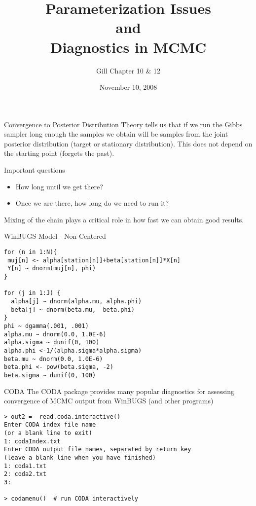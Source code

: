 \documentclass[dvips]{beamer}
\title{Parameterization Issues \\ and \\Diagnostics in MCMC}
\author{Gill Chapter 10 \& 12}
\date{November 10, 2008}
\begin{document}
\maketitle
\begin{slide}{Convergence to Posterior Distribution}
Theory tells us that if we run the Gibbs sampler long enough the
samples we obtain will be samples from the joint posterior
distribution (target or stationary distribution).  This does not
depend on the starting point (forgets the past).

\vspace{.25in}
Important questions
\begin{itemize}
\item  How long until we get there?
\item  Once we are there, how long do we need to run it?
\end{itemize}
Mixing of the chain plays a critical role in how fast we can obtain
good results.
\end{slide}
\begin{slide}{WinBUGS Model - Non-Centered}
\begin{verbatim}
for (n in 1:N){
 muj[n] <- alpha[station[n]]+beta[station[n]]*X[n]
 Y[n] ~ dnorm(muj[n], phi)
}

for (j in 1:J) {
  alpha[j] ~ dnorm(alpha.mu, alpha.phi)
  beta[j] ~ dnorm(beta.mu,  beta.phi)
}
phi ~ dgamma(.001, .001)
alpha.mu ~ dnorm(0.0, 1.0E-6)
alpha.sigma ~ dunif(0, 100)
alpha.phi <-1/(alpha.sigma*alpha.sigma)
beta.mu ~ dnorm(0.0, 1.0E-6)
beta.phi <- pow(beta.sigma, -2)
beta.sigma ~ dunif(0, 100)
\end{verbatim}
\end{slide}
\begin{slide}{CODA}
The CODA package provides many popular diagnostics for assessing
convergence of MCMC output from WinBUGS (and other programs)
\begin{verbatim}
> out2 =  read.coda.interactive() 
Enter CODA index file name
(or a blank line to exit)
1: codaIndex.txt
Enter CODA output file names, separated by return key
(leave a blank line when you have finished)
1: coda1.txt
2: coda2.txt
3:

> codamenu()  # run CODA interactively
\end{verbatim}




\end{slide}
\end{document}
